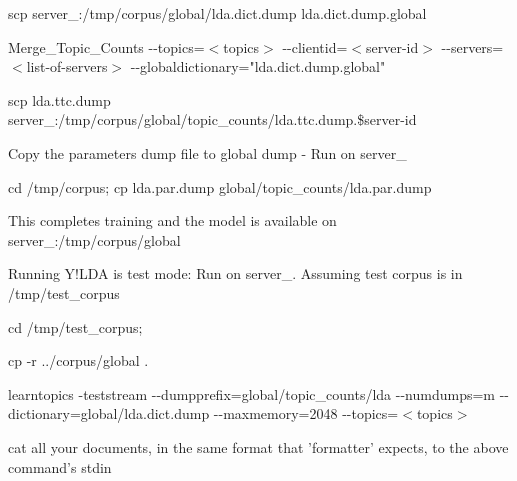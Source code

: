 \begin{DoxyEnumerate}
\begin{DoxyEnumerate}
\begin{DoxyEnumerate}
\begin{DoxyEnumerate}
{\ttfamily scp server\_:/tmp/corpus/global/lda.dict.dump lda.dict.dump.global} 
\item 

{\ttfamily Merge\_\-Topic\_\-Counts -\/-\/topics=$<$topics$>$ -\/-\/clientid=$<$server-\/id$>$ -\/-\/servers=$<$list-\/of-\/servers$>$ -\/-\/globaldictionary="lda.dict.dump.global"} 
\item 

{\ttfamily scp lda.ttc.dump server\_:/tmp/corpus/global/topic\_\-counts/lda.ttc.dump.\$server-\/id} 
\end{DoxyEnumerate}
\item 

Copy the parameters dump file to global dump -\/ Run on server\_ 
\begin{DoxyEnumerate}
\item 

{\ttfamily cd /tmp/corpus; cp lda.par.dump global/topic\_\-counts/lda.par.dump} 
\end{DoxyEnumerate}
\item 

This completes training and the model is available on server\_:/tmp/corpus/global 
\end{DoxyEnumerate}
\item 

Running Y!LDA is test mode: Run on server\_. Assuming test corpus is in /tmp/test\_\-corpus 
\begin{DoxyEnumerate}
\item 

{\ttfamily cd /tmp/test\_\-corpus;}  
\item 

{\ttfamily cp -\/r ../corpus/global .} 
\item 

{\ttfamily learntopics -\/teststream -\/-\/dumpprefix=global/topic\_\-counts/lda -\/-\/numdumps=m -\/-\/dictionary=global/lda.dict.dump -\/-\/maxmemory=2048 -\/-\/topics=$<$topics$>$} 
\item 

cat all your documents, in the same format that 'formatter' expects, to the above command's stdin 
\end{DoxyEnumerate}
\end{DoxyEnumerate}
\end{DoxyEnumerate}